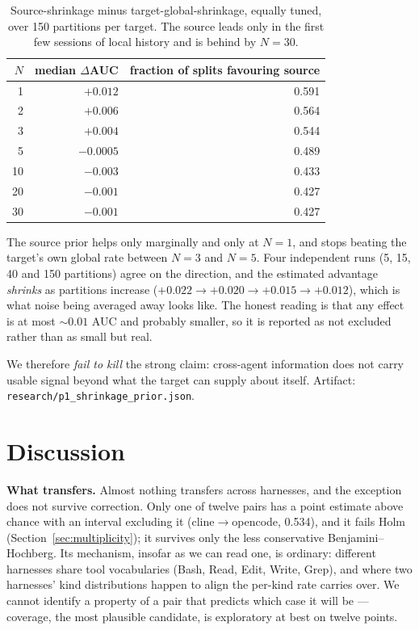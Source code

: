 \documentclass[11pt]{article}
\begin{document}
\begin{table}[t]
\centering
\caption{Source-shrinkage minus target-global-shrinkage, equally tuned, over
150 partitions per target. The source leads only in the first few sessions of
local history and is behind by $N=30$.}
\label{tab:shrinkage}
\small
\begin{tabular}{rrr}
\toprule
$N$ & median $\Delta$AUC & fraction of splits favouring source \\
\midrule
 1 & $+0.012$ & 0.591 \\
 2 & $+0.006$ & 0.564 \\
 3 & $+0.004$ & 0.544 \\
 5 & $-0.0005$ & 0.489 \\
10 & $-0.003$ & 0.433 \\
20 & $-0.001$ & 0.427 \\
30 & $-0.001$ & 0.427 \\
\bottomrule
\end{tabular}
\end{table}

The source prior helps only marginally and only at $N=1$, and stops beating the
target's own global rate between $N=3$ and $N=5$. Four independent runs (5, 15,
40 and 150 partitions) agree on the direction, and the estimated advantage
\emph{shrinks} as partitions increase ($+0.022 \to +0.020 \to +0.015 \to
+0.012$), which is what noise being averaged away looks like. The honest reading
is that any effect is at most $\sim 0.01$ AUC and probably smaller, so it is
reported as not excluded rather than as small but real.

We therefore \emph{fail to kill} the strong claim: cross-agent information does
not carry usable signal beyond what the target can supply about itself. Artifact:
\texttt{research/p1\_shrinkage\_prior.json}.

\section{Discussion}

\textbf{What transfers.} Almost nothing transfers across harnesses, and the
exception does not survive correction. Only one of twelve pairs has a
point estimate above chance with an interval excluding it
(cline$\to$opencode, 0.534), and it fails Holm
(Section~\ref{sec:multiplicity}); it survives only the less conservative
Benjamini--Hochberg. Its mechanism, insofar as we can read one, is ordinary:
different harnesses share tool vocabularies (Bash, Read, Edit, Write, Grep),
and where two harnesses' kind distributions happen to align the per-kind
rate carries over. We cannot identify a property of a pair that predicts
which case it will be --- coverage, the most plausible candidate, is
exploratory at best on twelve points.
\end{document}
